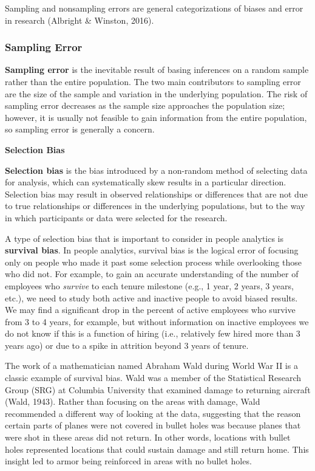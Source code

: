 \documentclass[
]{book}
\begin{document}
Sampling and nonsampling errors are general categorizations of biases and error in research (Albright \& Winston, 2016).

\hypertarget{sampling-error}{%
\subsubsection{Sampling Error}\label{sampling-error}}

\textbf{Sampling error} is the inevitable result of basing inferences on a random sample rather than the entire population. The two main contributors to sampling error are the size of the sample and variation in the underlying population. The risk of sampling error decreases as the sample size approaches the population size; however, it is usually not feasible to gain information from the entire population, so sampling error is generally a concern.

\textbf{Selection Bias}

\textbf{Selection bias} is the bias introduced by a non-random method of selecting data for analysis, which can systematically skew results in a particular direction. Selection bias may result in observed relationships or differences that are not due to true relationships or differences in the underlying populations, but to the way in which participants or data were selected for the research.

A type of selection bias that is important to consider in people analytics is \textbf{survival bias}. In people analytics, survival bias is the logical error of focusing only on people who made it past some selection process while overlooking those who did not. For example, to gain an accurate understanding of the number of employees who \emph{survive} to each tenure milestone (e.g., 1 year, 2 years, 3 years, etc.), we need to study both active and inactive people to avoid biased results. We may find a significant drop in the percent of active employees who survive from 3 to 4 years, for example, but without information on inactive employees we do not know if this is a function of hiring (i.e., relatively few hired more than 3 years ago) or due to a spike in attrition beyond 3 years of tenure.

The work of a mathematician named Abraham Wald during World War II is a classic example of survival bias. Wald was a member of the Statistical Research Group (SRG) at Columbia University that examined damage to returning aircraft (Wald, 1943). Rather than focusing on the areas with damage, Wald recommended a different way of looking at the data, suggesting that the reason certain parts of planes were not covered in bullet holes was because planes that were shot in these areas did not return. In other words, locations with bullet holes represented locations that could sustain damage and still return home. This insight led to armor being reinforced in areas with no bullet holes.
\end{document}

